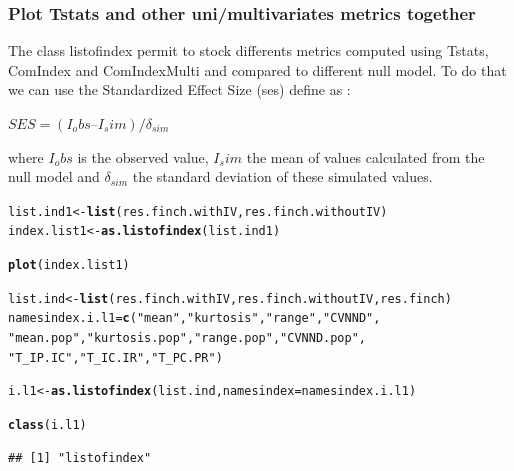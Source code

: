 \documentclass[12pt]{article}\usepackage[]{graphicx}\usepackage[]{color}
\makeatletter
\newcommand{\hlstr}[1]{\textcolor[rgb]{0.192,0.494,0.8}{#1}}%
\newcommand{\hlstd}[1]{\textcolor[rgb]{0.345,0.345,0.345}{#1}}%
\newcommand{\hlkwb}[1]{\textcolor[rgb]{0.69,0.353,0.396}{#1}}%
\newcommand{\hlkwc}[1]{\textcolor[rgb]{0.333,0.667,0.333}{#1}}%
\newcommand{\hlkwd}[1]{\textcolor[rgb]{0.737,0.353,0.396}{\textbf{#1}}}%
\newenvironment{kframe}{%
 \def\at@end@of@kframe{}%
 \ifinner\ifhmode%
  \def\at@end@of@kframe{\end{minipage}}%
  \begin{minipage}{\columnwidth}%
 \fi\fi%
 \def\FrameCommand##1{\hskip\@totalleftmargin \hskip-\fboxsep
 \colorbox{shadecolor}{##1}\hskip-\fboxsep
     \hskip-\linewidth \hskip-\@totalleftmargin \hskip\columnwidth}%
 \MakeFramed {\advance\hsize-\width
   \@totalleftmargin\z@ \linewidth\hsize
   \@setminipage}}%
 {\par\unskip\endMakeFramed%
 \at@end@of@kframe}
\newenvironment{knitrout}{}{} %
\makeatother
\begin{document}
\subsubsection{Plot Tstats and other uni/multivariates metrics together}
The class listofindex permit to stock differents metrics computed using Tstats, ComIndex and ComIndexMulti and compared to different null model. To do that we can use the Standardized Effect Size (ses) define as : 

\begin{center}
$SES = (I_obs – I_sim) / \delta_{sim}$
\end{center}

where $I_obs$ is the observed value, $I_sim$ the mean of values calculated from the null model and $\delta_{sim}$ the standard deviation of these simulated values.


\begin{knitrout}
\color{fgcolor}\begin{kframe}
\begin{alltt}
\hlstd{list.ind1}\hlkwb{<-}\hlkwd{list}\hlstd{(res.finch.withIV, res.finch.withoutIV)}
\hlstd{index.list1}\hlkwb{<-}\hlkwd{as.listofindex}\hlstd{(list.ind1)}

\hlkwd{plot}\hlstd{(index.list1)}
\end{alltt}
\end{kframe}
\end{knitrout}

\begin{knitrout}
\color{fgcolor}\begin{kframe}
\begin{alltt}
\hlstd{list.ind}\hlkwb{<-}\hlkwd{list}\hlstd{(res.finch.withIV, res.finch.withoutIV, res.finch)}
\hlstd{namesindex.i.l1}\hlkwb{=}\hlkwd{c}\hlstd{(}\hlstr{"mean"}\hlstd{,} \hlstr{"kurtosis"}\hlstd{,} \hlstr{"range"}\hlstd{,} \hlstr{"CVNND"}\hlstd{,}
                  \hlstr{"mean.pop"}\hlstd{,} \hlstr{"kurtosis.pop"}\hlstd{,} \hlstr{"range.pop"}\hlstd{,} \hlstr{"CVNND.pop"}\hlstd{,}
                  \hlstr{"T_IP.IC"}\hlstd{,} \hlstr{"T_IC.IR"}\hlstd{,} \hlstr{"T_PC.PR"}\hlstd{)}

\hlstd{i.l1}\hlkwb{<-}\hlkwd{as.listofindex}\hlstd{(list.ind,} \hlkwc{namesindex}\hlstd{=namesindex.i.l1)}

\hlkwd{class}\hlstd{(i.l1)}
\end{alltt}
\begin{verbatim}
## [1] "listofindex"
\end{verbatim}
\end{kframe}
\end{knitrout}
\end{document}
